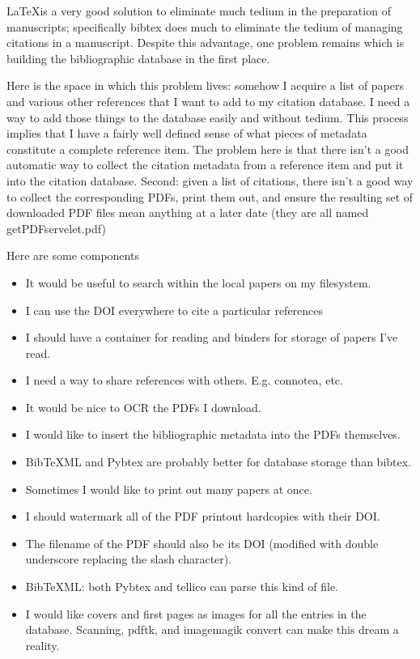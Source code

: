 \documentclass[letterpaper,12pt]{article}
\begin{document}
\LaTeX is a very good solution to eliminate much tedium in the preparation of manuscripts; specifically bibtex does much to eliminate the tedium of managing citations in a manuscript. Despite this advantage, one problem remains which is building the bibliographic database in the first place.

Here is the space in which this problem lives: somehow I acquire a list of papers and various other references that I want to add to my citation database. I need a way to add those things to the database easily and without tedium. This process implies that I have a fairly well defined sense of what pieces of metadata constitute a complete reference item. The problem here is that there isn't a good automatic way to collect the citation metadata from a reference item and put it into the citation database. Second: given a list of citations, there isn't a good way to collect the corresponding PDFs, print them out, and ensure the resulting set of downloaded PDF files mean anything at a later date (they are all named getPDFservelet.pdf)

Here are some components

\begin{itemize}
\item It would be useful to search within the local papers on my filesystem.
\item I can use the DOI everywhere to cite a particular references
\item I should have a container for reading and binders for storage of papers I've read.
\item I need a way to share references with others. E.g. connotea, etc.
\item It would be nice to OCR the PDFs I download.
\item I would like to insert the bibliographic metadata into the PDFs themselves.
\item BibTeXML and Pybtex are probably better for database storage than bibtex.
\item Sometimes I would like to print out many papers at once.
\item I should watermark all of the PDF printout hardcopies with their DOI.
\item The filename of the PDF should also be its DOI (modified with double underscore replacing the slash character).
\item BibTeXML: both Pybtex and tellico can parse this kind of file.
\item I would like covers and first pages as images for all the entries in the database. Scanning, pdftk, and imagemagik convert can make this dream a reality.
\end{itemize}
\end{document}
